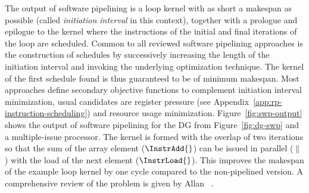 \documentclass[acmsmall,authorversion,nonacm]{acmart}
\begin{document}
The output of software pipelining is a loop kernel with as short a
makespan as possible (called \emph{initiation interval} in this
context), together with a prologue and epilogue to the kernel where
the instructions of the initial and final iterations of the loop are
scheduled.
Common to all reviewed software pipelining approaches is the
construction of schedules by successively increasing the length of the
initiation interval and invoking the underlying optimization
technique.
The kernel of the first schedule found is thus guaranteed to be of
minimum makespan.
Most approaches define secondary objective functions to complement
initiation interval minimization, usual candidates are register
pressure (see Appendix~\ref{app:rp-instruction-scheduling}) and
resource usage minimization.
Figure~\ref{fig:swp-output} shows the output of software pipelining
for the DG from Figure~\ref{fig:dg-swp} and a multiple-issue
processor.
The kernel is formed with the overlap of two iterations so that the
sum of the array element ($\InstrAdd{}$) can be issued in parallel
($\parallel$) with the load of the next element ($\InstrLoad{}$).
This improves the makespan of the example loop kernel by one cycle
compared to the non-pipelined version.
A comprehensive review of the problem is given by Allan
\etal{}~\cite{Allan1995}.
\end{document}
